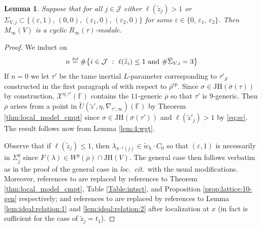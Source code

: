 \documentclass[oneside,a4paper,english, 11pt]{amsart}
\theoremstyle{plain}
\theoremstyle{plain}
\theoremstyle{plain}
\newtheorem{lemma}[thm]{Lemma}
\theoremstyle{plain}
\theoremstyle{plain}
\theoremstyle{plain}
\theoremstyle{definition}
\theoremstyle{definition}
\theoremstyle{definition}
\theoremstyle{remark}
\numberwithin{equation}{section}
\newcommand{\F}{\mathbb{F}}
\newcommand{\cJ}{\mathcal{J}}
\newcommand{\cS}{\mathcal{S}}
\newcommand{\cX}{\mathcal{X}}
\newcommand{\eps}{\varepsilon}
\newcommand{\speci}{\mathrm{sp}}
\newcommand{\un}[1]{\underline{#1}}
\newcommand{\tld}[1]{\widetilde{#1}}
\newcommand{\JH}{\mathrm{JH}}
\newcommand{\rhobar}{\overline{\rho}}
\newcommand{\defeq}{\stackrel{\textrm{\tiny{def}}}{=}}
\newcommand{\ovl}[1]{\overline{#1}}
\begin{document}
\begin{lemma}\label{lemma:broom}
Suppose that for all $j\in\cJ$ either $\ell(\tld{z}_j) > 1$ or $\Sigma_{V,j} \subset \{(\eps,1),\,(0,0),\,(\eps_1,0),\,(\eps_2,0)\}$ for some $\eps\in\{0,\, \eps_1,\,\eps_2\}$.
Then $M_\infty(V)$ is a cyclic $R_\infty(\tau)$-module.

%
%
%
%
\end{lemma}
\begin{proof}
%
%
We induct on 
\[
n\defeq \#\big\{i\in\cJ\ :\  \ell(\tld{z}_{i})\leq 1\text{ and }\#\ovl{\Sigma}_{V,i}=3 \big\}
\]
If $n=0$ we let $\tau'$ be the tame inertial $L$-parameter corresponding to $\tau'_{\cS}$ constructed in the first paragraph of \cite[Lemma 5.1.4]{LLLM2} with respect to $\rhobar^{\speci}$.
Since $\sigma \in \JH(\ovl{\sigma}(\tau))$ by construction, $\cX^{\eta,\tau'}(\F)$ contains the $11$-generic $\rhobar$ so that $\tau'$ is $9$-generic. 
Then $\rhobar$ arises from a point in $\tld{U}(\tld{z}',\eta,\nabla_{\tau',\infty})(\F)$ by Theorem \ref{thm:local_model_cmpt} since $\sigma \in \JH(\ovl{\sigma}(\tau'))$ and $\ell(\tld{z}'_j) > 1$ by \eqref{eq:sc}. 
The result follows now from Lemma \ref{lem:4:wgt}.

Observe that if $\ell(\tld{z}_j) \leq 1$, then $\lambda_{\pi^{-1}(j)} \in \tld{w}_h \cdot C_0$ so that $(\eps,1)$ is necessarily in $\Sigma^g_j$ since $F(\lambda) \in W^g(\rhobar) \cap \JH(V)$. 
The general case then follows verbatim as in the proof of the general case in \emph{loc.~cit}.~with the usual modifications. 
Moreover, references to \cite[Theorem 3.6.4, Table 3, Theorem 4.1.9]{LLLM2} are replaced by references to Theorem \ref{thm:local_model_cmpt}, Table \ref{Table:intsct}, and Proposition \ref{prop:lattice:10-gen} respectively; and references to \cite[Lemma 3.6.12, Lemma 3.6.16(3.19)]{LLLM2} are replaced by references to Lemma \ref{lem:ideal:relation:1} and \ref{lem:ideal:relation:2} after localization at $x$ (in fact \cite[Lemma 3.6.12]{LLLM2} is sufficient for the case of $\tld{z}_j = t_{\un{1}}$). 
\end{proof}
\end{document}
